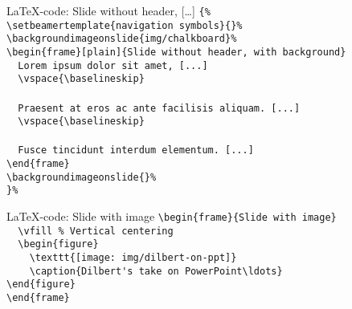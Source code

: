\documentclass[t,11pt]{beamer}
\begin{document}
\toggleslidecolors
\begin{frame}[fragile]{\LaTeX-code: Slide without header, [\ldots]}
\footnotesize
\verb|{%|\\
\verb|\setbeamertemplate{navigation symbols}{}%|\\
\verb|\backgroundimageonslide{img/chalkboard}%|\\
\verb|\begin{frame}[plain]{Slide without header, with background}|\\
\verb|  Lorem ipsum dolor sit amet, [...]|\\
\verb|  \vspace{\baselineskip}|\\
\verb||\\
\verb|  Praesent at eros ac ante facilisis aliquam. [...]|\\
\verb|  \vspace{\baselineskip}|\\
\verb||\\
\verb|  Fusce tincidunt interdum elementum. [...]|\\
\verb|\end{frame}|\\
\verb|\backgroundimageonslide{}%|\\
\verb|}%|\\
\end{frame}
\toggleslidecolors


\toggleslidecolors
\begin{frame}[fragile]{\LaTeX-code: Slide with image}
\footnotesize
\verb|\begin{frame}{Slide with image}|\\
\verb|  \vfill % Vertical centering|\\
\verb|  \begin{figure}|\\
\verb|    \texttt{[image: img/dilbert-on-ppt]}|\\
\verb|    \caption{Dilbert's take on PowerPoint\ldots}|\\
\verb|\end{figure}|\\
\verb|\end{frame}|\\
\end{frame}
\toggleslidecolors
\end{document}
